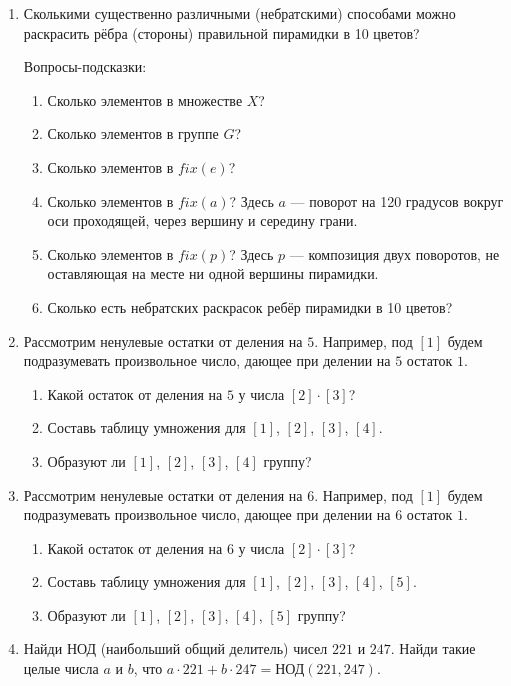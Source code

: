 \documentclass[12pt]{article} %
\begin{document}
\begin{enumerate}
\item Сколькими существенно различными (небратскими) способами можно раскрасить рёбра (стороны) правильной пирамидки в 10 цветов?

Вопросы-подсказки:
\begin{enumerate}
\item Сколько элементов в множестве $X$?
\item Сколько элементов в группе $G$?
\item Сколько элементов в $fix(e)$?
\item Сколько элементов в $fix(a)$? Здесь $a$ — поворот на 120 градусов вокруг оси проходящей, через вершину и середину грани.
\item Сколько элементов в $fix(p)$? Здесь $p$ — композиция двух поворотов, не оставляющая на месте ни одной вершины пирамидки.
\item Сколько есть небратских раскрасок ребёр пирамидки в 10 цветов?
\end{enumerate}

\item Рассмотрим ненулевые остатки от деления на $5$. Например, под $[1]$ будем подразумевать произвольное число, дающее при делении на $5$ остаток $1$.
\begin{enumerate}
\item Какой остаток от деления на $5$ у числа $[2]\cdot [3]$?
\item Составь таблицу умножения для $[1]$, $[2]$, $[3]$, $[4]$.
\item Образуют ли $[1]$, $[2]$, $[3]$, $[4]$ группу?
\end{enumerate}

\item Рассмотрим ненулевые остатки от деления на $6$. Например, под $[1]$ будем подразумевать произвольное число, дающее при делении на $6$ остаток $1$.
\begin{enumerate}
\item Какой остаток от деления на $6$ у числа $[2]\cdot [3]$?
\item Составь таблицу умножения для $[1]$, $[2]$, $[3]$, $[4]$, $[5]$.
\item Образуют ли $[1]$, $[2]$, $[3]$, $[4]$, $[5]$ группу?
\end{enumerate}

\item Найди НОД (наибольший общий делитель) чисел $221$ и $247$. Найди такие целые числа $a$ и $b$, что $a\cdot 221 + b\cdot 247 = \text{НОД}(221, 247)$.


\end{enumerate}
\end{document}
